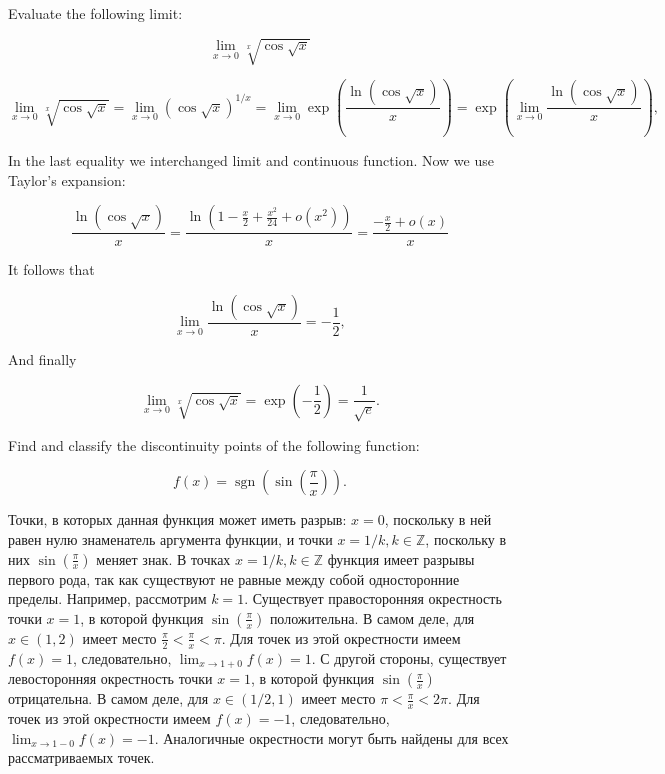 \documentclass[addpoints, answers]{exam} %
\DeclareMathOperator{\sgn}{sgn}
\begin{document}
\begin{questions}

\question[10] Evaluate the following limit:

\[
\lim_{x \to 0} \sqrt[x]{\cos \sqrt{x}}
\]

\begin{solution}

\[
\lim_{x \rightarrow 0} \sqrt[x]{\cos \sqrt{x}} = \lim_{x \rightarrow 0} \left({\cos \sqrt{x}}\right) ^{1/x} =  \lim_{x \rightarrow 0} \exp
\left( \frac{\ln (\cos \sqrt{x})}{x} \right) = \exp \left( \lim_{x \rightarrow 0}
\frac{\ln (\cos \sqrt{x})}{x} \right),
\]

In the last equality we interchanged limit and continuous function. Now we use Taylor's expansion:

\[
\frac{\ln (\cos \sqrt{x})}{x} = \frac{\ln (1-
\frac{x}{2}+\frac{x^2}{24}+o(x^2))}{x} = \frac{-\frac{x}{2}+o(x)}{x}
\]

\noindent It follows that

\[
\lim_{x \rightarrow 0} \frac{\ln (\cos \sqrt{x})}{x} = -\frac{1}{2},
\]

\noindent And finally

\[
\lim_{x \rightarrow 0} \sqrt[x]{\cos \sqrt{x}} = \exp \left( -\frac{1}{2}\right) = \frac{1}{\sqrt{e}}.
\]
\end{solution}

\question[10] Find and classify the discontinuity points of the following function:

\[
f(x) = {\sgn} \left(\sin \left( \frac{\pi}{x}\right)\right).
\]

\begin{solution}
Точки, в которых данная функция может иметь разрыв: $x=0$, поскольку в ней равен нулю знаменатель аргумента функции, и точки $x=1/k, k \in \mathbb{Z}$, поскольку в них $\sin \left( \frac{\pi}{x}\right)$ меняет знак. В точках $x=1/k, k \in \mathbb{Z}$ функция имеет разрывы первого рода, так как существуют не равные между собой односторонние пределы. Например, рассмотрим $k=1$. Существует правосторонняя окрестность точки $x=1$, в которой функция $\sin \left( \frac{\pi}{x} \right)$ положительна. В самом деле, для $x \in (1,2)$ имеет место $\frac{\pi}{2} < \frac{\pi}{x} < \pi$. Для точек из этой окрестности имеем $f(x) = 1$, следовательно, $\lim_{x \rightarrow 1+0} f(x) = 1$. С другой стороны, существует левосторонняя окрестность точки $x=1$, в которой функция $\sin \left( \frac{\pi}{x} \right)$ отрицательна. В самом деле, для $x \in (1/2,1)$ имеет место $\pi < \frac{\pi}{x} < 2 \pi$. Для точек из этой окрестности имеем $f(x) = -1$, следовательно, $\lim_{x \rightarrow 1-0} f(x) = -1$. Аналогичные окрестности могут быть найдены для всех рассматриваемых точек.




\end{solution}
\end{questions}
\end{document}
